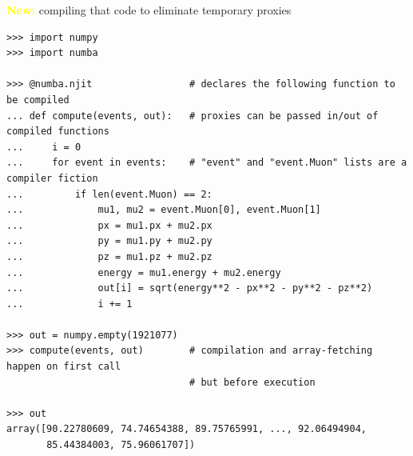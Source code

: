 \documentclass[aspectratio=169]{beamer}
\begin{document}
\begin{frame}[fragile]{\textcolor{yellow}{\bf New:} compiling that code to eliminate temporary proxies}
\vspace{0.15 cm}
\scriptsize
\begin{verbatim}
>>> import numpy
>>> import numba

>>> @numba.njit                 # declares the following function to be compiled
... def compute(events, out):   # proxies can be passed in/out of compiled functions
...     i = 0
...     for event in events:    # "event" and "event.Muon" lists are a compiler fiction
...         if len(event.Muon) == 2:
...             mu1, mu2 = event.Muon[0], event.Muon[1]
...             px = mu1.px + mu2.px
...             py = mu1.py + mu2.py
...             pz = mu1.pz + mu2.pz
...             energy = mu1.energy + mu2.energy
...             out[i] = sqrt(energy**2 - px**2 - py**2 - pz**2)
...             i += 1

>>> out = numpy.empty(1921077)
>>> compute(events, out)        # compilation and array-fetching happen on first call
                                # but before execution

>>> out
array([90.22780609, 74.74654388, 89.75765991, ..., 92.06494904,
       85.44384003, 75.96061707])
\end{verbatim}
\end{frame}
\end{document}
